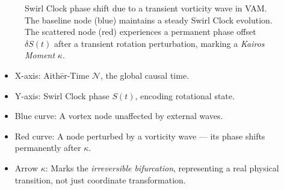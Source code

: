 \begin{figure}[H]
\centering
{}
\caption{Swirl Clock phase shift due to a transient vorticity wave in VAM.
The baseline node (blue) maintains a steady Swirl Clock evolution.
The scattered node (red) experiences a permanent phase offset \( \delta S(t) \) after a transient rotation perturbation, marking a \emph{Kairos Moment} \( \kappa \).}
\label{fig:swirl_phase_shift}
\end{figure}

\begin{itemize}
\item X-axis: Aithēr-Time $\mathcal{N}$, the global causal time.
\item Y-axis: Swirl Clock phase $S(t)$, encoding rotational state.
\item Blue curve: A vortex node unaffected by external waves.
\item Red curve: A node perturbed by a vorticity wave — its phase shifts permanently after $\kappa$.
\item Arrow $\kappa$: Marks the \textit{irreversible bifurcation}, representing a real physical transition, not just coordinate transformation.
\end{itemize}




